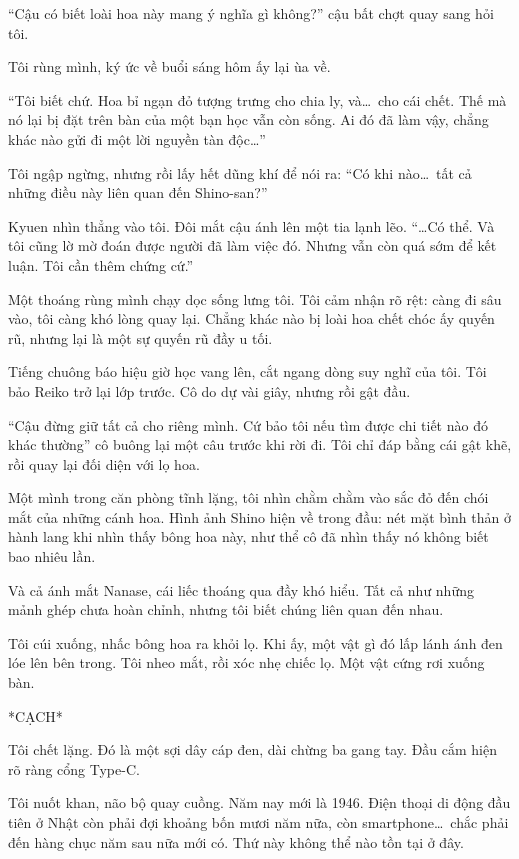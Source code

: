 \documentclass[../main.tex]{subfiles}
\begin{document}
``Cậu có biết loài hoa này mang ý nghĩa gì không?'' cậu bất chợt quay sang hỏi tôi.

Tôi rùng mình, ký ức về buổi sáng hôm ấy lại ùa về.

``Tôi biết chứ. Hoa bỉ ngạn đỏ tượng trưng cho chia ly, và\dots\ cho cái chết. Thế mà nó lại bị đặt trên bàn của một bạn học vẫn còn sống. Ai đó đã làm vậy, chẳng khác nào gửi đi một lời nguyền tàn độc\dots''

Tôi ngập ngừng, nhưng rồi lấy hết dũng khí để nói ra: ``Có khi nào\dots\ tất cả những điều này liên quan đến Shino-san?''

Kyuen nhìn thẳng vào tôi. Đôi mắt cậu ánh lên một tia lạnh lẽo. ``\dots Có thể. Và tôi cũng lờ mờ đoán được người đã làm việc đó. Nhưng vẫn còn quá sớm để kết luận. Tôi cần thêm chứng cứ.''

Một thoáng rùng mình chạy dọc sống lưng tôi. Tôi cảm nhận rõ rệt: càng đi sâu vào, tôi càng khó lòng quay lại. Chẳng khác nào bị loài hoa chết chóc ấy quyến rũ, nhưng lại là một sự quyến rũ đầy u tối.


Tiếng chuông báo hiệu giờ học vang lên, cắt ngang dòng suy nghĩ của tôi. Tôi bảo Reiko trở lại lớp trước. Cô do dự vài giây, nhưng rồi gật đầu.

``Cậu đừng giữ tất cả cho riêng mình. Cứ bảo tôi nếu tìm được chi tiết nào đó khác thường'' cô buông lại một câu trước khi rời đi. Tôi chỉ đáp bằng cái gật khẽ, rồi quay lại đối diện với lọ hoa.

Một mình trong căn phòng tĩnh lặng, tôi nhìn chằm chằm vào sắc đỏ đến chói mắt của những cánh hoa. Hình ảnh Shino hiện về trong đầu: nét mặt bình thản ở hành lang khi nhìn thấy bông hoa này, như thể cô đã nhìn thấy nó không biết bao nhiêu lần.

Và cả ánh mắt Nanase, cái liếc thoáng qua đầy khó hiểu. Tất cả như những mảnh ghép chưa hoàn chỉnh, nhưng tôi biết chúng liên quan đến nhau.

Tôi cúi xuống, nhấc bông hoa ra khỏi lọ. Khi ấy, một vật gì đó lấp lánh ánh đen lóe lên bên trong. Tôi nheo mắt, rồi xóc nhẹ chiếc lọ. Một vật cứng rơi xuống bàn.

*CẠCH*

Tôi chết lặng. Đó là một sợi dây cáp đen, dài chừng ba gang tay. Đầu cắm hiện rõ ràng cổng Type-C.

Tôi nuốt khan, não bộ quay cuồng. Năm nay mới là 1946. Điện thoại di động đầu tiên ở Nhật còn phải đợi khoảng bốn mươi năm nữa, còn smartphone\dots\ chắc phải đến hàng chục năm sau nữa mới có. Thứ này không thể nào tồn tại ở đây.
\end{document}

